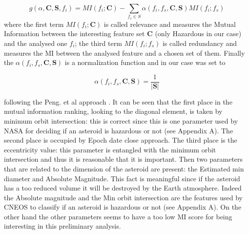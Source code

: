 \documentclass[12pt,%
               a4paper,%
               oneside,openany,%
               titlepage,%
               headinclude,footinclude,%
               BCOR5mm,%
               cleardoublepage=empty,%
               tablecaptionabove,%
               floatperchapter,
               ]{scrreprt}                 %
\begin{document}
\begin{equation}
g(\alpha,\textbf{C},\textbf{S},f_{i})=MI(f_{i};\textbf{C})-\sum_{f_{s}\in S}\alpha(f_{i},f_{s},\textbf{C},\textbf{S})MI(f_{i};f_{s})
\end{equation}
where the first term $MI(f_{i};\textbf{C})$ is called relevance and measures the Mutual Information between the interesting feature set $\textbf{C}$ (only Hazardous in our case) and the analysed one $f_{i}$; the third term $MI(f_{i};f_{s})$ is called redundancy and measures the MI between the analysed feature and a chosen set of them. Finally the $\alpha(f_{i},f_{s},\textbf{C},\textbf{S})$ is a normalization function and in our case was set to \cite{kratzer2018varrank}

\begin{equation}
\alpha(f_{i},f_{s},\textbf{C},\textbf{S})=\dfrac{1}{|\textbf{S}|}
\end{equation}

following the Peng. et al approach \cite{peng2005feature}. It can be seen that the first place in the mutual information ranking, looking to the diagonal element, is taken by minimum orbit intersection: this is correct since this is one parameter used by NASA for deciding if an asteroid is hazardous or not (see Appendix A). The second place is occupied by Epoch date close approach. The third place is the eccentricity value: this parameter is entangled with the minimum orbit intersection and thus it is reasonable that it is important. Then two parameters that are related to the dimension of the asteroid are present: the Estimated min diameter and Absolute Magnitude. This fact is meaningful since if the asteroid has a too reduced volume it will be destroyed by the Earth atmosphere. Indeed the Absolute magnitude and the Min orbit intersection are the features used by CNEOS to classify if an asteroid is hazardous or not (see Appendix A). On the other hand the other parameters seems to have a too low MI score for being interesting in this preliminary analysis. 
\end{document}
